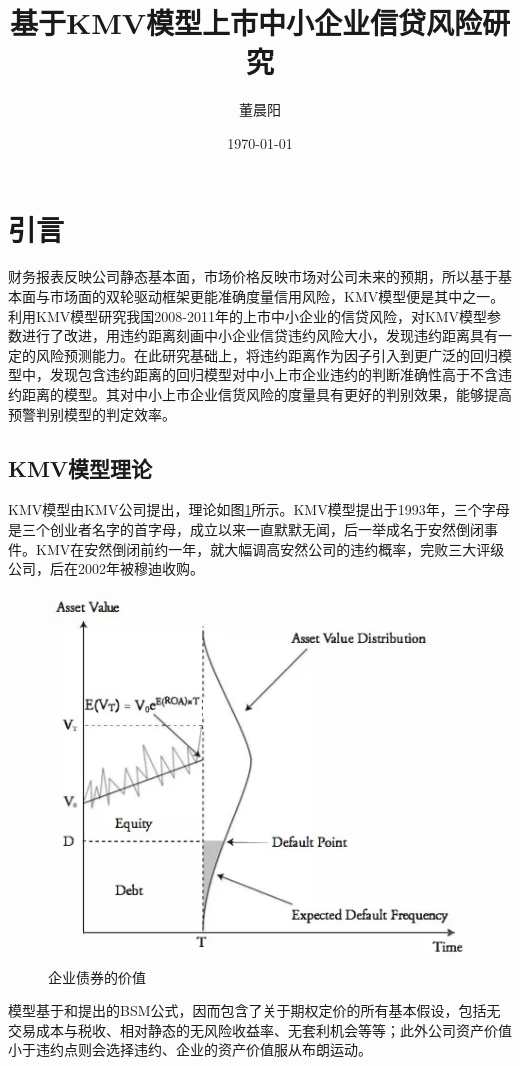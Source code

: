 \documentclass[a4paper,12pt]{ctexart}
\title{基于KMV模型上市中小企业信贷风险研究}
\author{董晨阳}
\date{\today}
\begin{document}
\maketitle
\section*{引言}
财务报表反映公司静态基本面，市场价格反映市场对公司未来的预期，所以基于基本面与市场面的双轮驱动框架更能准确度量信用风险，KMV模型便是其中之一。\citet{彭伟2012基于}利用KMV模型研究我国2008-2011年的上市中小企业的信贷风险，对KMV模型参数进行了改进，用违约距离刻画中小企业信贷违约风险大小，发现违约距离具有一定的风险预测能力。在此研究基础上，\citet{彭伟2012我国上市中小企业信贷风险研究}将违约距离作为因子引入到更广泛的回归模型中，发现包含违约距离的回归模型对中小上市企业违约的判断准确性高于不含违约距离的模型。其对中小上市企业信货风险的度量具有更好的判别效果，能够提高预警判别模型的判定效率。

\subsection*{KMV模型理论}

KMV模型由KMV公司提出，理论如图\ref{fig:bsm}所示。KMV模型提出于1993年，三个字母是三个创业者名字的首字母，成立以来一直默默无闻，后一举成名于安然倒闭事件。KMV在安然倒闭前约一年，就大幅调高安然公司的违约概率，完败三大评级公司，后在2002年被穆迪收购。
\begin{figure}[ht]
    \centering
    \includegraphics*[width=0.8\linewidth]{img/KMV.png}
    \caption{企业债券的价值}\label{fig:bsm}
\end{figure}

模型基于\citet{black1973pricing}和\citet{merton1974pricing}提出的BSM公式，因而包含了关于期权定价的所有基本假设，包括无交易成本与税收、相对静态的无风险收益率、无套利机会等等；此外公司资产价值小于违约点则会选择违约、企业的资产价值服从布朗运动。
\end{document}
